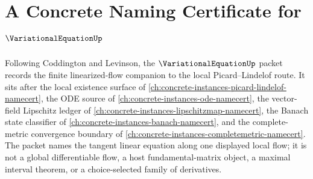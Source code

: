 \chapter{A Concrete Naming Certificate for $\VariationalEquationUp$}
\label{ch:concrete-instances-variational-equation-namecert}

Following Coddington and Levinson, the $\VariationalEquationUp$ packet records the finite linearized-flow companion to the local Picard--Lindelof route. It sits after the local existence surface of \autoref{ch:concrete-instances-picard-lindelof-namecert}, the ODE source of \autoref{ch:concrete-instances-ode-namecert}, the vector-field Lipschitz ledger of \autoref{ch:concrete-instances-lipschitzmap-namecert}, the Banach state classifier of \autoref{ch:concrete-instances-banach-namecert}, and the complete-metric convergence boundary of \autoref{ch:concrete-instances-completemetric-namecert}. The packet names the tangent linear equation along one displayed local flow; it is not a global differentiable flow, a host fundamental-matrix object, a maximal interval theorem, or a choice-selected family of derivatives.

